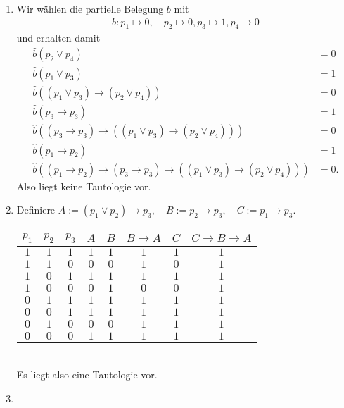 \begin{solution}
\phantom{}
\begin{enumerate}[label = \alph*.]
    \item Wir wählen die partielle Belegung $b$ mit
    \begin{align*}
    b: p_1 \mapsto 0, \quad p_2 \mapsto 0, p_3 \mapsto 1, p_4 \mapsto 0
    \end{align*}
    und erhalten damit
    \begin{align*}
      \hat{b}(p_2 \lor p_4) &= 0 \\
      \hat{b}(p_1 \lor p_3) &= 1 \\
      \hat{b}((p_1 \lor p_3) \to (p_2 \lor p_4)) &= 0 \\
      \hat{b}(p_3 \to p_3) &= 1 \\
      \hat{b}((p_3 \to p_3) \to ((p_1 \lor p_3) \to (p_2 \lor p_4))) &= 0 \\
      \hat{b}(p_1 \to p_2) &= 1 \\
      \hat{b}((p_1 \to p_2) \to (p_3 \to p_3) \to ((p_1 \lor p_3) \to (p_2 \lor p_4))) &= 0.
    \end{align*}
    Also liegt keine Tautologie vor.
    \item
    Definiere $A := (p_1 \lor p_2) \to p_3, \quad B := p_2 \to p_3, \quad C:= p_1 \to p_3$. \\
    \begin{tabular}{|c|c|c|c|c|c|c|c|}
    \hline
    $p_1$ & $p_2$ & $p_3$ & $A$ & $B$ & $B \to A$
    & $C$ & $C \to B \to A$\\
    \hline
    $1$ & $1$ & $1$ & $1$ & $1$ & $1$ & $1$ & $1$\\
    \hline
    $1$ & $1$ & $0$ & $0$ & $0$ & $1$ & $0$ & $1$\\
    \hline
    $1$ & $0$ & $1$ & $1$ & $1$ & $1$ & $1$ & $1$\\
    \hline
    $1$ & $0$ & $0$ & $0$ & $1$ & $0$ & $0$ & $1$\\
    \hline
    $0$ & $1$ & $1$ & $1$ & $1$ & $1$ & $1$ & $1$\\
    \hline
    $0$ & $0$ & $1$ & $1$ & $1$ & $1$ & $1$ & $1$\\
    \hline
    $0$ & $1$ & $0$ & $0$ & $0$ & $1$ & $1$ & $1$\\
    \hline
    $0$ & $0$ & $0$ & $1$ & $1$ & $1$ & $1$ & $1$\\
    \hline
    \end{tabular} \\
    Es liegt also eine Tautologie vor.
    \item

\end{enumerate}
\end{solution}
